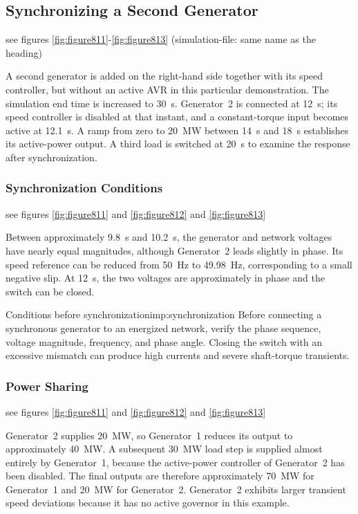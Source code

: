 \subsection{Synchronizing a Second Generator} see figures \ref{fig:figure811}-\ref{fig:figure813}  (simulation-file: same name as the heading)

A second generator is added on the right-hand side together with its speed
controller, but without an active AVR in this particular demonstration. The
simulation end time is increased to \SI{30}{\second}. Generator~2 is connected
at \SI{12}{\second}; its speed controller is disabled at that instant, and a
constant-torque input becomes active at \SI{12.1}{\second}. A ramp from zero
to \SI{20}{\mega\watt} between \SI{14}{\second} and
\SI{18}{\second} establishes its active-power output. A third load is switched
at \SI{20}{\second} to examine the response after synchronization.

\subsubsection{Synchronization Conditions} see figures \ref{fig:figure811} and \ref{fig:figure812} and \ref{fig:figure813}

Between approximately \SI{9.8}{\second} and \SI{10.2}{\second}, the generator
and network voltages have nearly equal magnitudes, although Generator~2 leads
slightly in phase. Its speed reference can be reduced from \SI{50}{\hertz} to
\SI{49.98}{\hertz}, corresponding to a small negative slip. At
\SI{12}{\second}, the two voltages are approximately in phase and the switch
can be closed.

\begin{important}{Conditions before synchronization}{imp:synchronization}
Before connecting a synchronous generator to an energized network, verify the
phase sequence, voltage magnitude, frequency, and phase angle. Closing the
switch with an excessive mismatch can produce high currents and severe shaft-torque transients.
\end{important}

\subsubsection{Power Sharing} see figures \ref{fig:figure811} and \ref{fig:figure812} and \ref{fig:figure813}

Generator~2 supplies \SI{20}{\mega\watt}, so Generator~1 reduces its output to
approximately \SI{40}{\mega\watt}. A subsequent
\SI{30}{\mega\watt} load step is supplied almost entirely by Generator~1,
because the active-power controller of Generator~2 has been disabled. The final
outputs are therefore approximately \SI{70}{\mega\watt} for Generator~1 and
\SI{20}{\mega\watt} for Generator~2. Generator~2 exhibits larger transient
speed deviations because it has no active governor in this example.

